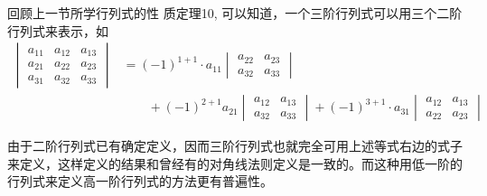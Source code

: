 回顾上一节所学行列式的性
质定理10, 可以知道，一个三阶行列式可以用三个二阶行列式来表示，如
\[\begin{split}
\begin{vmatrix}
   a_{11}&a_{12}&a_{13}\\
a_{21}&a_{22}&a_{23}\\
a_{31}&a_{32}&a_{33}  
\end{vmatrix}&=(-1)^{1+1}\cdot a_{11}\begin{vmatrix}
    a_{22}&a_{23}\\ a_{32}&a_{33} 
\end{vmatrix}\\
&\qquad +(-1)^{2+1}a_{21}\begin{vmatrix}
    a_{12}&a_{13}\\a_{32}&a_{33}  
\end{vmatrix}
+(-1)^{3+1}\cdot a_{31}\begin{vmatrix}
    a_{12}&a_{13}\\a_{22}&a_{23}
\end{vmatrix}
\end{split}\]

由于二阶行列式已有确定定义，因而三阶行列式也就完全可用上述等式右边的式子来定义，这样定义的结果和曾经有的对角线法则定义是一致的。而这种用低一阶的行列式来定义高一阶行列式的方法更有普遍性。


